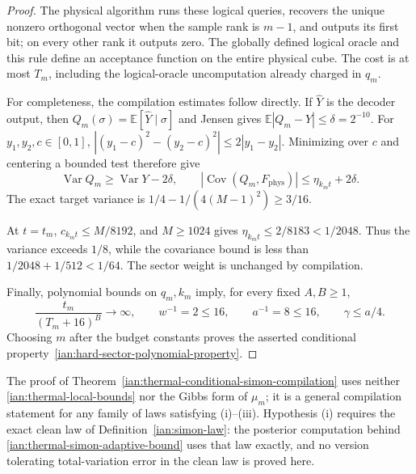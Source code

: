 \begin{proof}
The physical algorithm runs these logical queries, recovers the
unique nonzero orthogonal vector when the sample rank is \(m-1\),
and outputs its first bit; on every other rank it outputs zero.
The globally defined logical oracle and this rule define an
acceptance function on the entire physical cube.
The cost is at most \(T_m\), including the logical-oracle
uncomputation already charged in \(q_m\).

For completeness, the compilation estimates follow directly.
If \(\widehat Y\) is the decoder output, then
\(Q_m(\sigma)=\mathbb E[\widehat Y\mid\sigma]\) and Jensen gives
\(\mathbb E|Q_m-Y|\le\delta=2^{-10}\).
For \(y_1,y_2,c\in[0,1]\),
\(|(y_1-c)^2-(y_2-c)^2|\le2|y_1-y_2|\).
Minimizing over \(c\) and centering a bounded test therefore give
\[
 \operatorname{Var}Q_m\ge\operatorname{Var}Y-2\delta,
 \qquad
 |\operatorname{Cov}(Q_m,F_{\mathrm{phys}})|
 \le\eta_{k_mt}+2\delta.
 \tag{36.32}
\]
The exact target variance is
\(1/4-1/(4(M-1)^2)\ge3/16\).

At \(t=t_m\), \(c_{k_mt}\le M/8192\), and \(M\ge1024\) gives
\(\eta_{k_mt}\le2/8183<1/2048\).
Thus the variance exceeds \(1/8\), while the covariance bound is
less than \(1/2048+1/512<1/64\).
The sector weight is unchanged by compilation.

Finally, polynomial bounds on \(q_m,k_m\) imply, for every fixed
\(A,B\ge1\),
\[
 \frac{t_m}{(T_m+16)^B}\longrightarrow\infty,
 \qquad
 w^{-1}=2\le16,\qquad a^{-1}=8\le16,
 \qquad \gamma\le a/4.
 \tag{36.33}
\]
Choosing \(m\) after the budget constants proves the asserted
conditional property~\eqref{ian:hard-sector-polynomial-property}.
\end{proof}

\begin{remark}
\label{ian:thermal-conditional-scope}
The proof of Theorem~\ref{ian:thermal-conditional-simon-compilation}
uses neither \eqref{ian:thermal-local-bounds} nor the Gibbs form of
\(\mu_m\); it is a general compilation statement for any family of laws
satisfying (i)--(iii). Hypothesis (i) requires the exact clean law of
Definition~\ref{ian:simon-law}: the posterior computation behind
\eqref{ian:thermal-simon-adaptive-bound} uses that law exactly, and no
version tolerating total-variation error in the clean law is proved
here.
\end{remark}

